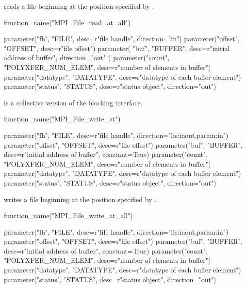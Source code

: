  reads a file
beginning at the position specified by .

%
%
%
\begin{mpi-binding}
    function_name("MPI_File_read_at_all")
    
    parameter("fh", "FILE", desc=r"file handle", direction="in")
    parameter("offset", "OFFSET", desc=r"file offset")
    parameter(
        "buf", "BUFFER", desc=r"initial address of buffer", direction="out"
    )
    parameter("count", "POLYXFER_NUM_ELEM", desc=r"number of elements in buffer")
    parameter("datatype", "DATATYPE", desc=r"datatype of each buffer element")
    parameter("status", "STATUS", desc=r"status object", direction="out")
\end{mpi-binding}

 is a collective version
of the blocking  interface.

%
%
%
\begin{mpi-binding}
    function_name("MPI_File_write_at")
    
    parameter("fh", "FILE", desc=r"file handle", direction="lis:inout,param:in")
    parameter("offset", "OFFSET", desc=r"file offset")
    parameter("buf", "BUFFER", desc=r"initial address of buffer", constant=True)
    parameter("count", "POLYXFER_NUM_ELEM", desc=r"number of elements in buffer")
    parameter("datatype", "DATATYPE", desc=r"datatype of each buffer element")
    parameter("status", "STATUS", desc=r"status object", direction="out")
\end{mpi-binding}

 writes a file
beginning at the position specified by .


%
%
%
\begin{mpi-binding}
    function_name("MPI_File_write_at_all")
    
    parameter("fh", "FILE", desc=r"file handle", direction="lis:inout,param:in")
    parameter("offset", "OFFSET", desc=r"file offset")
    parameter("buf", "BUFFER", desc=r"initial address of buffer", constant=True)
    parameter("count", "POLYXFER_NUM_ELEM", desc=r"number of elements in buffer")
    parameter("datatype", "DATATYPE", desc=r"datatype of each buffer element")
    parameter("status", "STATUS", desc=r"status object", direction="out")
\end{mpi-binding}

